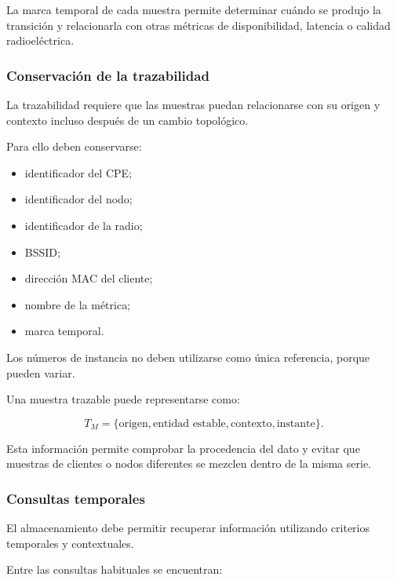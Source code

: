 La marca temporal de cada muestra permite determinar cuándo se produjo
la transición y relacionarla con otras métricas de disponibilidad,
latencia o calidad radioeléctrica.


\subsubsection*{Conservación de la trazabilidad}

La trazabilidad requiere que las muestras puedan relacionarse con su
origen y contexto incluso después de un cambio topológico.

Para ello deben conservarse:

\begin{itemize}
    \item identificador del CPE;

    \item identificador del nodo;

    \item identificador de la radio;

    \item BSSID;

    \item dirección MAC del cliente;

    \item nombre de la métrica;

    \item marca temporal.
\end{itemize}

Los números de instancia no deben utilizarse como única referencia,
porque pueden variar.

Una muestra trazable puede representarse como:

\[
    T_M
    =
    \{
        \text{origen},
        \text{entidad estable},
        \text{contexto},
        \text{instante}
    \}.
\]

Esta información permite comprobar la procedencia del dato y evitar que
muestras de clientes o nodos diferentes se mezclen dentro de la misma
serie.


\subsubsection*{Consultas temporales}

El almacenamiento debe permitir recuperar información utilizando
criterios temporales y contextuales.

Entre las consultas habituales se encuentran:

